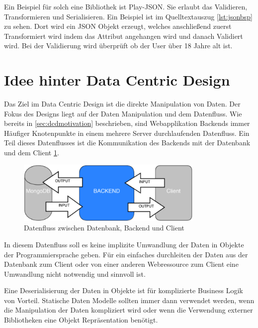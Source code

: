 Ein Beispiel für solch eine Bibliothek ist Play-JSON. Sie erlaubt das Validieren, Transformieren und Serialisieren. Ein Beispiel ist im Quelltextauszug \ref{lst:jsonbsp} zu sehen. Dort wird ein JSON Objekt erzeugt, welches anschließend zuerst Transformiert wird indem das Attribut  angehangen wird und danach Validiert wird. Bei der Validierung wird überprüft ob der User über 18 Jahre alt ist.



\section{Idee hinter Data Centric Design}
Das Ziel im Data Centric Design ist die direkte Manipulation von Daten. Der Fokus des Designs liegt auf der Daten Manipulation und dem Datenfluss. Wie bereits in \ref{sec:dcdmotivation} beschrieben, sind Webapplikation Backends immer Häufiger Knotenpunkte in einem mehrere Server durchlaufenden Datenfluss. Ein Teil dieses Datenflusses ist die Kommunikation des Backends mit der Datenbank und dem Client \ref{fig:dataflow}. 

\begin{figure}[h]   
  \centering     
  \includegraphics[width=0.8\textwidth]{img/dataflow.png}  
   \caption{Datenfluss zwischen Datenbank, Backend und Client}   
  \label{fig:dataflow} 
\end{figure}

In diesem Datenfluss soll es keine implizite Umwandlung der Daten in Objekte der Programmiersprache geben. Für ein einfaches durchleiten der Daten aus der Datenbank zum Client oder von einer anderen Webressource zum Client eine Umwandlung nicht notwendig und sinnvoll ist. 

Eine Deserialisierung der Daten in Objekte ist für komplizierte Business Logik von Vorteil. Statische Daten Modelle sollten immer dann verwendet werden, wenn die Manipulation der Daten kompliziert wird oder wenn die Verwendung externer Bibliotheken eine Objekt Repräsentation benötigt. 

